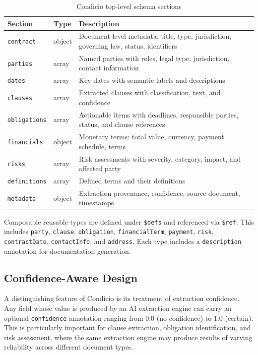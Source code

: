 \documentclass[11pt,a4paper]{article}
\begin{document}
\begin{table}[h]
\centering
\caption{Condicio top-level schema sections}
\label{tab:sections}
\begin{tabular}{p{3cm}p{2cm}p{8cm}}
\toprule
\textbf{Section} & \textbf{Type} & \textbf{Description} \\
\midrule
\texttt{contract} & object & Document-level metadata: title, type, jurisdiction, governing law, status, identifiers \\
\texttt{parties} & array & Named parties with roles, legal type, jurisdiction, contact information \\
\texttt{dates} & array & Key dates with semantic labels and descriptions \\
\texttt{clauses} & array & Extracted clauses with classification, text, and confidence \\
\texttt{obligations} & array & Actionable items with deadlines, responsible parties, status, and clause references \\
\texttt{financials} & object & Monetary terms: total value, currency, payment schedule, terms \\
\texttt{risks} & array & Risk assessments with severity, category, impact, and affected party \\
\texttt{definitions} & array & Defined terms and their definitions \\
\texttt{metadata} & object & Extraction provenance, confidence, source document, timestamps \\
\bottomrule
\end{tabular}
\end{table}

Composable reusable types are defined under \texttt{\$defs} and referenced via \texttt{\$ref}. This includes \texttt{party}, \texttt{clause}, \texttt{obligation}, \texttt{financialTerm}, \texttt{payment}, \texttt{risk}, \texttt{contractDate}, \texttt{contactInfo}, and \texttt{address}. Each type includes a \texttt{description} annotation for documentation generation.

\subsection{Confidence-Aware Design}

A distinguishing feature of Condicio is its treatment of extraction confidence. Any field whose value is produced by an AI extraction engine can carry an optional \texttt{confidence} annotation ranging from 0.0 (no confidence) to 1.0 (certain). This is particularly important for clause extraction, obligation identification, and risk assessment, where the same extraction engine may produce results of varying reliability across different document types.
\end{document}
